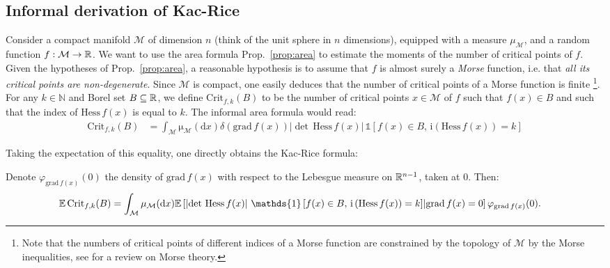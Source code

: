 \documentclass[amsmath,amssymb,nofootinbib,prd]{article}
\begin{document}
	
	\subsection{Informal derivation of Kac-Rice}
	
	Consider a compact manifold $\mathcal{M}$ of dimension $n$ (think of the unit sphere in $n$ dimensions), equipped with a measure $\mu_{\mathcal{M}}$, and a random function $f : \mathcal{M} \to \mathbb{R}$. We want to use the area formula Prop.~\ref{prop:area} to estimate the moments of the number of critical points of $f$. Given the hypotheses of Prop.~\ref{prop:area}, a reasonable hypothesis is to assume that $f$ is almost surely a \emph{Morse} function, i.e. that \emph{all its critical points are non-degenerate}. Since $\mathcal{M}$ is compact, one easily deduces that the number of critical points of a Morse function is finite \footnote{Note that the numbers of critical points of different indices of a Morse function are constrained by the topology of $\mathcal{M}$ by the Morse inequalities, see \cite{milnor1963morse} for a review on Morse theory.}. For any $k \in \mathbb{N}$ and Borel set $B \subseteq \mathbb{R}$, we define $\mathrm{Crit}_{f,k}(B)$ to be the number of critical points $x \in \mathcal{M}$ of $f$ such that $f(x) \in B$ and such that the index of $\mathrm{Hess}\, f(x)$ is equal to $k$. The informal area formula would read:
	\begin{align}
	\mathrm{Crit}_{f,k}(B) &= \int_{\mathcal{M}} \mathrm{\mu}_{\mathcal{M}}(\mathrm{d}x) \delta\left(\mathrm{grad}\, f(x)\right) \left|\det \, \mathrm{Hess}\, f(x)\right| \, \mathds{1}\left[f(x) \in B,\, \mathrm{i}\left(\mathrm{Hess}\, f(x)\right) = k\right]
	\end{align}
	
	Taking the expectation of this equality, one directly obtains the Kac-Rice formula:
	\begin{proposition}\label{prop:KR}Denote  $\varphi_{\mathrm{grad}\, f(x)}(0)$ the density of $\mathrm{grad}\, f(x)$ with respect to the Lebesgue measure on $\mathbb{R}^{n-1}$, taken at $0$. Then:
	\begin{align*}
	\EE \, \mathrm{Crit}_{f,k}(B) &= \int_{\mathcal{M}} \mathrm{\mu}_{\mathcal{M}}(\mathrm{d}x) \EE \left[\left|\det \, \mathrm{Hess}\, f(x)\right| \, \mathds{1}\left[f(x) \in B,\, \mathrm{i}\left(\mathrm{Hess}\, f(x)\right) = k\right] \middle| \mathrm{grad}\, f(x) = 0 \right] \varphi_{\mathrm{grad}\, f(x)}(0).
	\end{align*}
	\end{proposition}\vspace{0.cm}
	
\end{document}

